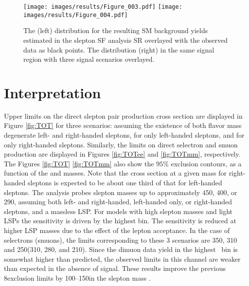 \begin{figure}[ht!]
\centering
\texttt{[image: images/results/Figure\_003.pdf]}
\texttt{[image: images/results/Figure\_004.pdf]}
\caption{The \ptmiss (left) distribution for the resulting SM background yields estimated in the slepton SF analysis SR overlayed with the observed data as black points.
The \mttwo distribution (right) in the same signal region with three signal scenarios overlayed.}
\label{fig:results}
\end{figure}
\section{Interpretation}
\noindent
\justify
Upper limits on the direct slepton pair production cross section are displayed in Figure \ref{fig:TOT} for three scenarios: assuming the existence of both flavor mass degenerate left- and
right-handed sleptons, for only left-handed sleptons, and for only right-handed sleptons. 
Similarly, the limits on direct selectron and smuon production are displayed in Figures \ref{fig:TOTee} and \ref{fig:TOTmm}, respectively.
The Figures \ref{fig:TOT} \ref{fig:TOTmm} also show the $95\%$ \CL exclusion contours, as a function of the \slep and \lsp masses.
Note that the cross section at a given mass for right-handed sleptons is expected to be about one third of that for left-handed sleptons.
The analysis probes slepton masses up to approximately 450, 400, or 290\GeV, assuming both left- and right-handed, left-handed only, or right-handed sleptons, and a massless LSP.
For models with high slepton masses and light LSPs the sensitivity is driven by the highest \ptmiss bin. The sensitivity is reduced at higher LSP masses due to the effect of the lepton acceptance.
In the case of selectrons (smuons), the limits corresponding to these 3 scenarios are 350, 310 and 250\GeV (310, 280, and 210\GeV).
Since the dimuon data yield in the highest \ptmiss\ bin is somewhat higher than predicted, the observed limits in this channel are weaker than expected in the absence of signal.
These results improve the previous 8\TeV exclusion limits by 100--150\GeV in the slepton mass \cite{Khachatryan:2014qwa}.
